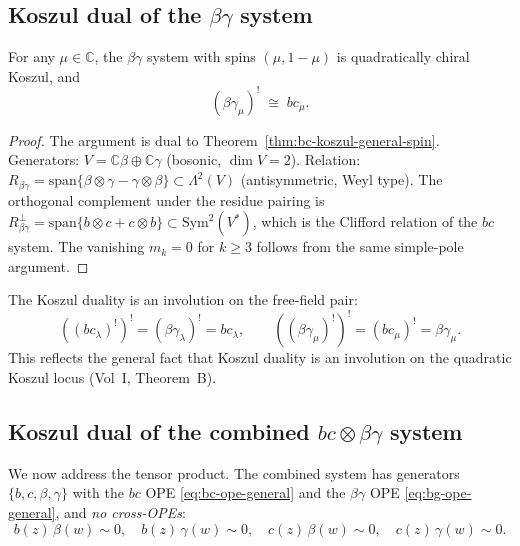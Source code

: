 \documentclass[11pt]{article}
\newcommand{\C}{\mathbb{C}}
\begin{document}
\subsection{Koszul dual of the $\beta\gamma$ system}

\begin{theorem}
\label{thm:bg-koszul-general-spin}
For any $\mu \in \C$, the $\beta\gamma$ system with spins
$(\mu, 1{-}\mu)$ is quadratically chiral Koszul, and
\begin{equation}\label{eq:bg-koszul-dual}
(\beta\gamma_\mu)^!
\;\cong\;
bc_\mu.
\end{equation}
\end{theorem}

\begin{proof}
The argument is dual to Theorem~\ref{thm:bc-koszul-general-spin}.
Generators: $V = \C\beta \oplus \C\gamma$ (bosonic, $\dim V = 2$).
Relation: $R_{\beta\gamma} = \mathrm{span}\{\beta \otimes \gamma
- \gamma \otimes \beta\} \subset \Lambda^2(V)$ (antisymmetric,
Weyl type).  The orthogonal complement under the residue pairing
is $R_{\beta\gamma}^\perp = \mathrm{span}\{b \otimes c + c
\otimes b\} \subset \mathrm{Sym}^2(V^*)$, which is the Clifford
relation of the $bc$ system.  The vanishing $m_k = 0$ for
$k \ge 3$ follows from the same simple-pole argument.
\end{proof}

\begin{observation}[Involutivity]
\label{obs:koszul-involution}
The Koszul duality is an involution on the free-field pair:
\[
((bc_\lambda)^!)^! = (\beta\gamma_\lambda)^! = bc_\lambda,
\qquad
((\beta\gamma_\mu)^!)^! = (bc_\mu)^! = \beta\gamma_\mu.
\]
This reflects the general fact that Koszul duality is an
involution on the quadratic Koszul locus
(Vol~I, Theorem~B).
\end{observation}


\subsection{Koszul dual of the combined $bc \otimes \beta\gamma$ system}

We now address the tensor product.  The combined system has
generators $\{b, c, \beta, \gamma\}$ with the $bc$ OPE
\eqref{eq:bc-ope-general} and the $\beta\gamma$ OPE
\eqref{eq:bg-ope-general}, and \emph{no cross-OPEs}:
\begin{equation}\label{eq:no-cross-ope}
b(z)\,\beta(w) \sim 0,\quad
b(z)\,\gamma(w) \sim 0,\quad
c(z)\,\beta(w) \sim 0,\quad
c(z)\,\gamma(w) \sim 0.
\end{equation}
\end{document}
